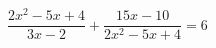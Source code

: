 \begin{ex}[type=equation]
	\begin{condition}
		$\dfrac{2x^2 - 5x + 4}{3x - 2} + \dfrac{15x -10}{2x^2 - 5x + 4} = 6$
	\end{condition}
\end{ex}